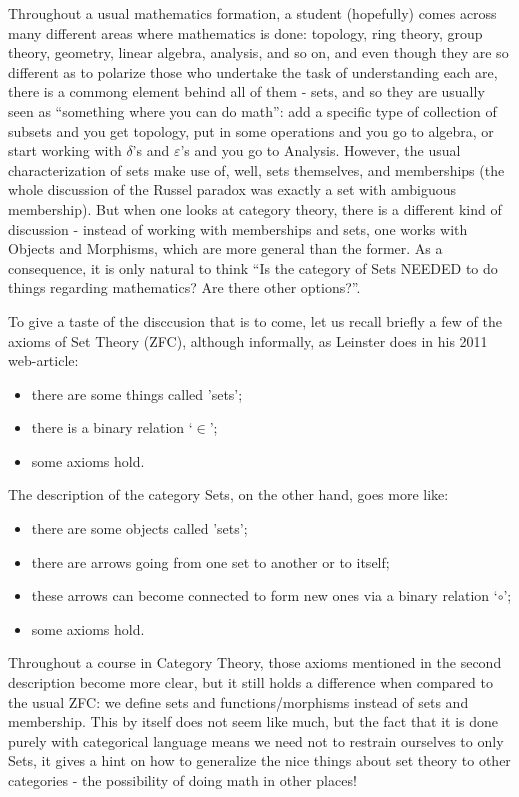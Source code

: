 \documentclass{article}
\begin{document}
Throughout a usual mathematics formation, a student (hopefully) comes across many different areas where mathematics is done: topology, ring theory, group theory, geometry, linear algebra, analysis, and so on, and even though they are so different as to polarize those who undertake the task of understanding each are, there is a commong element behind all of them - sets, and so they are usually seen as ``something where you can do math'': add a specific type of collection of subsets and you get topology, put in some operations and you go to algebra, or start working with \(\delta \)'s and \(\varepsilon \)'s and you go to Analysis. However, the usual characterization of sets make use of, well, sets themselves, and memberships (the whole discussion of the Russel paradox was exactly a set with ambiguous membership). But when one looks at category theory, there is a different kind of discussion - instead of working with memberships and sets, one works with Objects and Morphisms, which are more general than the former. As a consequence, it is only natural to think ``Is the category of Sets NEEDED to do things regarding mathematics? Are there other options?''.

To give a taste of the disccusion that is to come, let us recall briefly a few of the axioms of Set Theory (ZFC), although informally, as Leinster does in his 2011 web-article:
\begin{itemize}
	\item there are some things called 'sets';
	\item there is a binary relation `\(\in\)';
	\item some axioms hold.
\end{itemize}

The description of the category Sets, on the other hand, goes more like:
\begin{itemize}
	\item there are some objects called 'sets';
	\item there are arrows going from one set to another or to itself;
	\item these arrows can become connected to form new ones via a binary relation `\(\circ \)';
	\item some axioms hold.
\end{itemize}

Throughout a course in Category Theory, those axioms mentioned in the second description become more clear, but it still holds a difference when compared to the usual ZFC: we define sets and functions/morphisms instead of sets and membership. This by itself does not seem like much, but the fact that it is done purely with categorical language means we need not to restrain ourselves to only Sets, it gives a hint on how to generalize the nice things about set theory to other categories - the possibility of doing math in other places!
\end{document}
